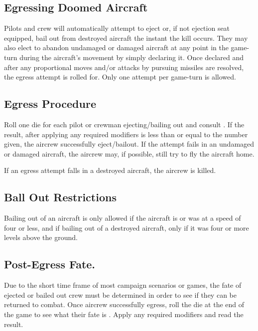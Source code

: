 \begin{advancedrules}
    \subsection{Egressing Doomed Aircraft} Pilots and crew will automatically attempt to eject or, if not ejection seat equipped, bail out from destroyed aircraft the instant the kill occurs. They may also elect to abandon undamaged or damaged aircraft at any point in the game-turn during the aircraft's movement by simply declaring it.   Once declared and after any proportional moves and/or attacks by pursuing missiles are resolved, the egress attempt is rolled for. Only one attempt per game-turn is allowed.

    \subsection{Egress Procedure} Roll one die for each pilot or crewman ejecting/bailing out and consult . If the result, after applying any required modifiers is less than or equal to the number given, the aircrew successfully eject/bailout.  If the attempt fails in an undamaged or damaged aircraft, the aircrew may, if possible, still try to fly the aircraft home.

    If an egress attempt falls in a destroyed aircraft, the aircrew is killed.

    \subsection{Ball Out Restrictions} Bailing out of an aircraft is only allowed if the aircraft is or was at a speed of four or less, and if bailing out of a destroyed aircraft, only if it was four or more levels above the ground.


    \subsection{Post-Egress Fate.\label{rule:post-egress-fate}} Due to the short time frame of most campaign scenarios or games, the fate of ejected or bailed out crew must be determined in order to see if they can be returned to combat. Once aircrew successfully egress, roll the die at the end of the game to see what their fate is . Apply any required modifiers and read the result.


\end{advancedrules}
